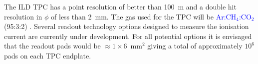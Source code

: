 The ILD TPC has a point resolution of better than 100~{\mu}m and a double hit resolution in $\phi$ of less than 2~mm.  The gas used for the TPC will be \textcolor{blue}{Ar:$\text{CH}_4$:$\text{CO}_{2}$} (95:3:2) \cite{arXiv:1006.3396}.  Several readout technology options designed to measure the ionisation current are currently under development.  For all potential options it is envisaged that the readout pads would be $\approx 1 \times 6$~$\text{mm}^{2}$ giving a total of approximately $10^{6}$ pads on each TPC endplate.

\begin{figure}[h!]
\centering
{}

\end{figure}
